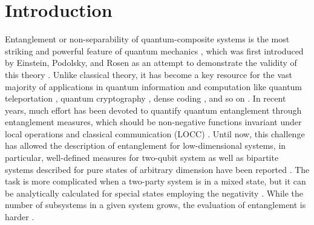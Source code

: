 
\maketitle

\section{\label{sec:intro}Introduction}

Entanglement or non-separability of quantum-composite systems is the most striking and powerful feature of quantum mechanics \citep{horodecki2009quantum}, which was first introduced by Einstein, Podolsky, and Rosen as an attempt to demonstrate the validity of this theory \cite{einstein1935phys, PhysicsPhysiqueFizika.1.195}. Unlike classical theory, it has become a key resource for the vast majority of applications in quantum information and computation like quantum teleportation \cite{bennett1993teleporting}, quantum cryptography \cite{RevModPhys.74.145}, dense coding \cite{bennett1992communication}, and so on \cite{raussendorf2001one, nielsen2000chuang, bennett2000quantum, vidal2003efficient}. In recent years, much effort has been devoted to quantify quantum entanglement through entanglement measures, which should be non-negative functions invariant under local operations and classical communication (LOCC) \cite{vedral1998entanglement, vidal2000entanglement}. Until now, this challenge has allowed the description of entanglement for low-dimensional systems, in particular, well-defined measures for two-qubit system as well as bipartite systems described for pure states of arbitrary dimension have been reported \cite{bennett1996mixed, horodecki2001distillation}. The task is more complicated when a two-party system is in a mixed state, but it can be analytically calculated for special states employing the negativity \cite{wootters2001entanglement, peres1996separability, vidal2002computable}. While the number of subsystems in a given system grows, the evaluation of entanglement is harder \cite{plenio2014introduction, walter2016multipartite}.

